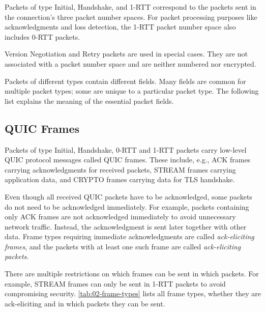 Packets of type Initial, Handshake, and 1-RTT correspond to the packets sent in the connection's
three packet number spaces. For packet processing purposes like acknowledgments and loss detection,
the 1-RTT packet number space also includes 0-RTT packets.

Version Negotiation and Retry packets are used in special cases. They are not associated with a
packet number space and are neither numbered nor encrypted.

Packets of different types contain different fields. Many fields are common for multiple packet
types; some are unique to a particular packet type. The following list explains the meaning of the
essential 
packet fields.



\subsection{QUIC Frames}

Packets of type Initial, Handshake, 0-RTT and 1-RTT packets carry low-level QUIC protocol messages
called QUIC frames. These include, e.g., ACK frames carrying acknowledgments for received packets,
STREAM frames carrying application data, and CRYPTO frames carrying data for TLS handshake.

Even though all received QUIC packets have to be acknowledged, some packets do not need to be
acknowledged immediately. For example, packets containing only ACK frames are not acknowledged
immediately to avoid unnecessary network traffic. Instead, the acknowledgment is sent later together
with other data. Frame types requiring immediate acknowledgments are called \textit{ack-eliciting
frames}, and the packets with at least one such frame are called \textit{ack-eliciting packets}.

There are multiple restrictions on which frames can be sent in which packets. For example, STREAM
frames can only be sent in 1-RTT packets to avoid compromising security.
\autoref{tab:02-frame-types} lists all frame types, whether they are ack-eliciting and in which
packets they can be sent.

